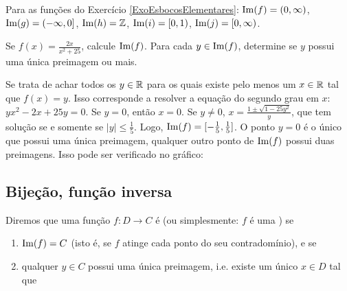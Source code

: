 \begin{exo}
\begin{sol}
Para as funções do Exercício \ref{ExoEsbocosElementares}:
$\operatorname{Im}(f)=(0,\infty)$,
$\operatorname{Im}(g)=(-\infty,0]$,
$\operatorname{Im}(h)=\mathbb{Z}$,
$\operatorname{Im}(i)=[0,1)$,
$\operatorname{Im}(j)=[0,\infty)$.
\end{sol}
\end{exo}

\begin{exo}
Se $f(x)=\frac{2x}{x^2+25}$, calcule $\operatorname{Im}(f)$. Para cada $y\in \operatorname{Im}(f)$, determine
se $y$ possui uma única preimagem ou mais.
\begin{sol}
Se trata de achar todos os $y\in \mathbb{R}$ para os quais existe pelo menos um $x\in
\mathbb{R}$ tal que $f(x)=y$. Isso corresponde a resolver a equação do segundo grau em
$x$: $yx^2-2x+25y=0$. Se $y=0$, então $x=0$. Se $y\neq 0$,
$x=\frac{1\pm\sqrt{1-25y^2}}{y}$, que tem solução se e somente se
$|y|\leq\tfrac15$.
Logo, $\operatorname{Im}(f)=[-\tfrac15,\tfrac15]$. O ponto $y=0$ é o único que possui uma única preimagem, qualquer outro ponto de $\operatorname{Im}(f)$ possui duas preimagens. Isso pode ser verificado no gráfico:
\begin{center}
 \begin{bmlimage}\end{bmlimage}
\end{center}
\end{sol}
\end{exo}

\subsection{Bijeção, função inversa}

Diremos que uma função $f:D\to C$ é  (ou
simplesmente: $f$ é uma ) 
se
\begin{enumerate} 
\item $\operatorname{Im}(f)=C$ (isto é, se $f$ atinge cada
ponto do seu contradomínio), e se 
\item 
qualquer $y\in C$ possui uma única preimagem, i.e.
existe um único $x\in D$ tal que
\end{enumerate}

